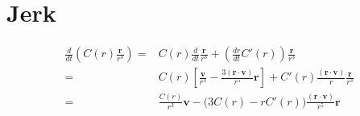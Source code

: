 \documentclass[11pt]{jsarticle}
\begin{document}
\section{Jerk}
\begin{equation}
\begin{aligned}
\frac{d}{dt} \left( C(r) \frac{\bm r}{r^3} \right)
	=& C(r) \frac{d}{dt} \frac{\bm r}{r^3} + \left(\frac{dr}{dt} C'(r) \right) \frac{\bm r}{r^3}  \\
	=& C(r) \left[ \frac{\bm v}{r^3} - \frac{3 (\bm r \cdot \bm v)}{r^5} \bm r \right] + C'(r) \frac{(\bm r \cdot \bm v)}{r} \frac{\bm r}{r^3} \\
	=&  \frac{C(r)}{r^3} \bm v - \bigl( 3 C(r) - r C'(r) \bigr) \frac{(\bm r \cdot \bm v)}{r^5} \bm r 
\end{aligned}
\end{equation}
\end{document}
